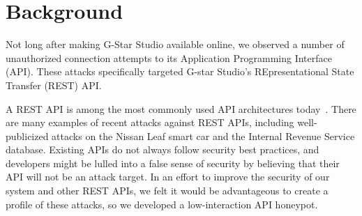 
\section{Background} \label{background}

Not long after making G-Star Studio available online, we observed a number of unauthorized connection attempts to its Application Programming Interface (API).  
These attacks specifically targeted G-star Studio's REpresentational State Transfer (REST) API.

A REST API is among the most commonly used API architectures today~\cite{REST-API-use}.
There are many examples of recent attacks against REST APIs, including well-publicized attacks on the Nissan Leaf smart car
and the Internal Revenue Service database.
Existing APIs do not always follow security best practices, and developers might be lulled into a false sense of security by believing that their API will not be an attack target.  
In an effort to improve the security of our system and other REST APIs, we felt it would be advantageous to create a profile of these attacks, so we developed a low-interaction API honeypot.


